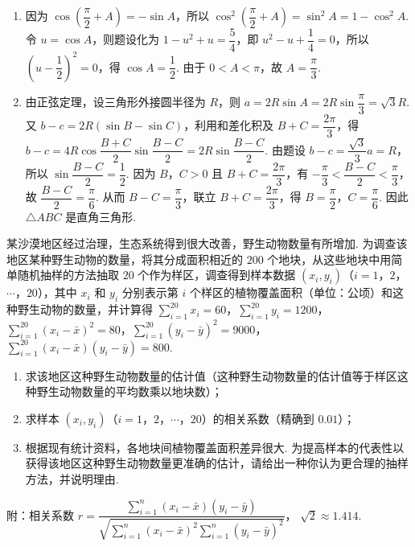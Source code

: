 \begin{solution}
\begin{enumerate}
\item 因为 \(\cos\left(\dfrac\pi2+A\right)=-\sin A\)，所以 \(\cos^2\left(\dfrac\pi2+A\right)=\sin^2A=1-\cos^2A\). 令 \(u=\cos A\)，则题设化为 \(1-u^2+u=\dfrac54\)，即 \(u^2-u+\dfrac14=0\)，所以 \(\left(u-\dfrac12\right)^2=0\)，得 \(\cos A=\dfrac12\). 由于 \(0<A<\pi\)，故 \(A=\dfrac\pi3\).
\item 由正弦定理，设三角形外接圆半径为 \(R\)，则 \(a=2R\sin A=2R\sin\dfrac\pi3=\sqrt3R\). 又 \(b-c=2R(\sin B-\sin C)\)，利用和差化积及 \(B+C=\dfrac{2\pi}3\)，得 \(b-c=4R\cos\dfrac{B+C}{2}\sin\dfrac{B-C}{2}=2R\sin\dfrac{B-C}{2}\). 由题设 \(b-c=\dfrac{\sqrt3}{3}a=R\)，所以 \(\sin\dfrac{B-C}{2}=\dfrac12\). 因为 \(B\)，\(C>0\) 且 \(B+C=\dfrac{2\pi}3\)，有 \(-\dfrac\pi3<\dfrac{B-C}{2}<\dfrac\pi3\)，故 \(\dfrac{B-C}{2}=\dfrac\pi6\). 从而 \(B-C=\dfrac\pi3\)，联立 \(B+C=\dfrac{2\pi}3\)，得 \(B=\dfrac\pi2\)，\(C=\dfrac\pi6\). 因此 \(\triangle ABC\) 是直角三角形.
\end{enumerate}
\end{solution}

\begin{problem}
某沙漠地区经过治理，生态系统得到很大改善，野生动物数量有所增加. 为调查该地区某种野生动物的数量，将其分成面积相近的 \(200\) 个地块，从这些地块中用简单随机抽样的方法抽取 \(20\) 个作为样区，调查得到样本数据 \((x_i,y_i)\)（\(i=1\)，\(2\)，\(\cdots\)，\(20\)），其中 \(x_i\) 和 \(y_i\) 分别表示第 \(i\) 个样区的植物覆盖面积（单位：公顷）和这种野生动物的数量，并计算得 \(\sum_{i=1}^{20}x_i=60\)，\(\sum_{i=1}^{20}y_i=1200\)，\(\sum_{i=1}^{20}(x_i-\bar x)^2=80\)，\(\sum_{i=1}^{20}(y_i-\bar y)^2=9000\)，\(\sum_{i=1}^{20}(x_i-\bar x)(y_i-\bar y)=800\).

\begin{enumerate}
\item 求该地区这种野生动物数量的估计值（这种野生动物数量的估计值等于样区这种野生动物数量的平均数乘以地块数）；
\item 求样本 \((x_i,y_i)\)（\(i=1\)，\(2\)，\(\cdots\)，\(20\)）的相关系数（精确到 \(0.01\)）；
\item 根据现有统计资料，各地块间植物覆盖面积差异很大. 为提高样本的代表性以获得该地区这种野生动物数量更准确的估计，请给出一种你认为更合理的抽样方法，并说明理由.
\end{enumerate}

附：相关系数
\(r=\dfrac{\sum_{i=1}^{n}(x_i-\bar x)(y_i-\bar y)}{\sqrt{\sum_{i=1}^{n}(x_i-\bar x)^2\sum_{i=1}^{n}(y_i-\bar y)^2}}\)，
\(\sqrt2\approx 1.414\).
\end{problem}

